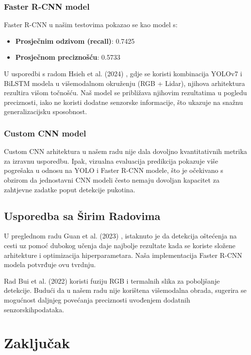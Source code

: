 \documentclass[conference]{IEEEtran}
\begin{document}
\subsubsection*{Faster R-CNN model}

Faster R-CNN u našim testovima pokazao se kao model s:
\begin{itemize}
    \item \textbf{Prosječnim odzivom (recall)}: 0.7425
    \item \textbf{Prosječnom preciznošću}: 0.5733
\end{itemize}

U usporedbi s radom Hsieh et al. (2024) \cite{hsieh2024}, gdje se koristi kombinacija YOLOv7 i BiLSTM modela u višemodalnom okruženju (RGB + Lidar), njihova arhitektura rezultira višom točnošću. Naš model se približava njihovim rezultatima u pogledu preciznosti, iako ne koristi dodatne senzorske informacije, što ukazuje na snažnu generalizacijsku sposobnost.

\subsubsection*{Custom CNN model}

Custom CNN arhitektura u našem radu nije dala dovoljno kvantitativnih metrika za izravnu usporedbu. Ipak, vizualna evaluacija predikcija pokazuje više pogrešaka u odnosu na YOLO i Faster R-CNN modele, što je očekivano s obzirom da jednostavni CNN modeli često nemaju dovoljan kapacitet za zahtjevne zadatke poput detekcije pukotina.

\subsection{Usporedba sa Širim Radovima}

U preglednom radu Guan et al. (2023) \cite{guan2023}, istaknuto je da detekcija oštećenja na cesti uz pomoć dubokog učenja daje najbolje rezultate kada se koriste složene arhitekture i optimizacija hiperparametara. Naša implementacija Faster R-CNN modela potvrđuje ovu tvrdnju.

Rad Bui et al. (2022) \cite{mdpi2022} koristi fuziju RGB i termalnih slika za poboljšanje detekcije. Budući da u našem radu nije korištena višemodalna obrada, sugerira se mogućnost daljnjeg povećanja preciznosti uvođenjem dodatnih senzorskihpodataka.


\section{Zaključak}
\label{pog:zakljucak}
\end{document}
